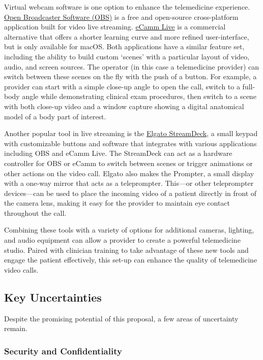 \documentclass[utf8]{FrontiersinHarvard} %
\begin{document}
Virtual webcam software is one option to enhance the telemedicine experience. \href{https://obsproject.com/}{Open Broadcaster Software (OBS)} is a free and open-source cross-platform application built for video live streaming. \href{https://ecamm.com/}{eCamm Live} is a commercial alternative that offers a shorter learning curve and more refined user-interface, but is only available for macOS. Both applications have a similar feature set, including the ability to build custom `scenes' with a particular layout of video, audio, and screen sources. The operator (in this case a telemedicine provider) can switch between these scenes on the fly with the push of a button. For example, a provider can start with a simple close-up angle to open the call, switch to a full-body angle while demonstrating clinical exam procedures, then switch to a scene with both close-up video and a window capture showing a digital anatomical model of a body part of interest.

Another popular tool in live streaming is the \href{https://www.elgato.com/us/en/s/explore-stream-deck}{Elgato StreamDeck}, a small keypad with customizable buttons and software that integrates with various applications including OBS and eCamm Live. The StreamDeck can act as a hardware controller for OBS or eCamm to switch between scenes or trigger animations or other actions on the video call. Elgato also makes the Prompter, a small display with a one-way mirror that acts as a teleprompter. This---or other teleprompter devices---can be used to place the incoming video of a patient directly in front of the camera lens, making it easy for the provider to maintain eye contact throughout the call.

Combining these tools with a variety of options for additional cameras, lighting, and audio equipment can allow a provider to create a powerful telemedicine studio. Paired with clinician training to take advantage of these new tools and engage the patient effectively, this set-up can enhance the quality of telemedicine video calls.

\subsection{Key Uncertainties}

Despite the promising potential of this proposal, a few areas of uncertainty remain.

\subsubsection{Security and Confidentiality}
\end{document}
